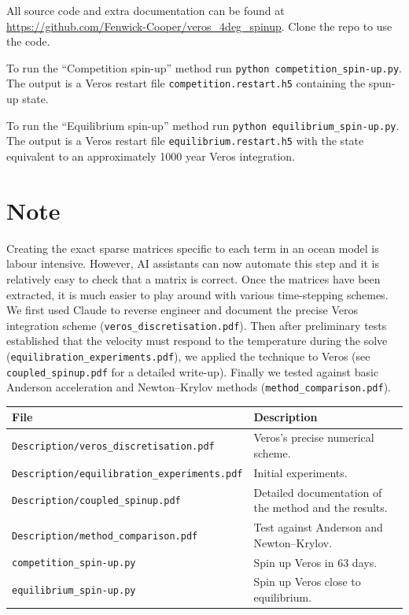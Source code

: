 \documentclass{article}
\begin{document}
All source code and extra documentation can be found at \url{https://github.com/Fenwick-Cooper/veros_4deg_spinup}. Clone the repo to use the code.

To run the ``Competition spin-up'' method run \texttt{python competition\_spin-up.py}. The output is a Veros restart file \texttt{competition.restart.h5} containing the spun-up state.

To run the ``Equilibrium spin-up'' method run \texttt{python equilibrium\_spin-up.py}. The output is a Veros restart file \texttt{equilibrium.restart.h5} with the state equivalent to an approximately 1000 year Veros integration.

\section*{Note}

Creating the exact sparse matrices specific to each term in an ocean model is labour intensive. However, AI assistants can now automate this step and it is relatively easy to check that a matrix is correct. Once the matrices have been extracted, it is much easier to play around with various time-stepping schemes. We first used Claude to reverse engineer and document the precise Veros integration scheme (\texttt{veros\_discretisation.pdf}). Then after preliminary tests established that the velocity must respond to the temperature during the solve (\texttt{equilibration\_experiments.pdf}), we applied the technique to Veros (see \texttt{coupled\_spinup.pdf} for a detailed write-up). Finally we tested against basic Anderson acceleration and Newton--Krylov methods (\texttt{method\_comparison.pdf}).

\begin{center}
\begin{tabular}{ll}
File & Description \\ 
\hline
\texttt{Description/veros\_discretisation.pdf} & Veros's precise numerical scheme. \\
\texttt{Description/equilibration\_experiments.pdf} & Initial experiments. \\
\texttt{Description/coupled\_spinup.pdf} & Detailed documentation of the method and the results. \\
\texttt{Description/method\_comparison.pdf} & Test against Anderson and Newton--Krylov. \\
\texttt{competition\_spin-up.py} & Spin up Veros in 63 days. \\
\texttt{equilibrium\_spin-up.py} & Spin up Veros close to equilibrium. \\
\end{tabular}
\end{center}
\end{document}
